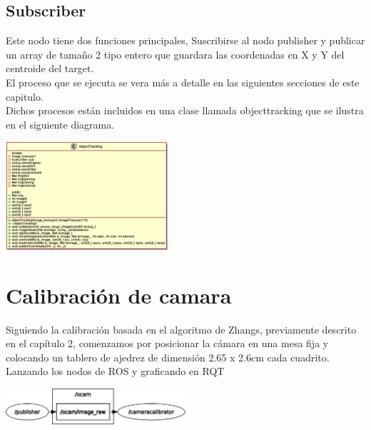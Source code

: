\subsection{Subscriber}
Este nodo tiene dos funciones principales, Suscribirse al nodo publisher y publicar
un array de tamaño 2 tipo entero que guardara las coordenadas en X y Y del centroide
del target.\\
El proceso que se ejecuta se vera más a detalle en las siguientes secciones de este
capitulo.\\
Dichos procesos están incluidos en una clase llamada objecttracking que se ilustra
en el siguiente diagrama.
\begin{center}
	\includegraphics[width=0.45\textwidth]{Contenido/Cuerpo/Capitulo4/object_tracking.eps}
	\label{Fig5}
\end{center}



\section{Calibración de camara}
Siguiendo la calibración basada en el algoritmo de Zhangs, previamente descrito en el capítulo 2,
comenzamos por posicionar la cámara en una mesa fija y colocando un tablero de ajedrez de dimensión
2.65 x 2.6cm cada cuadrito.\\ Lanzando los nodos de ROS y graficando en RQT
\begin{center}
	\includegraphics[width=0.5\textwidth]{Contenido/Cuerpo/Capitulo4/Fig11.eps}
	\label{Fig1}
\end{center}

